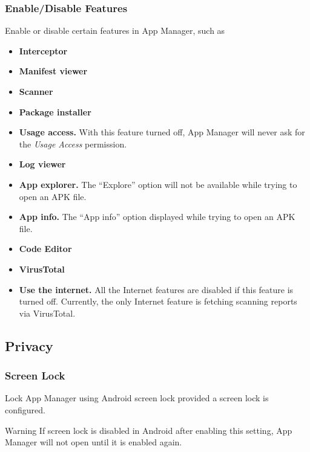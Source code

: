 \subsubsection{Enable/Disable Features}\label{subsubsec:enable/disable-features} %
Enable or disable certain features in App Manager, such as
\begin{itemize}
    \item \textbf{Interceptor}
    \item \textbf{Manifest viewer}
    \item \textbf{Scanner}
    \item \textbf{Package installer}
    \item \textbf{Usage access.} With this feature turned off, App Manager will never ask for the \textit{Usage Access} permission.
    \item \textbf{Log viewer}
    \item \textbf{App explorer.} The ``Explore'' option will not be available while trying to open an APK file.
    \item \textbf{App info.} The ``App info'' option displayed while trying to open an APK file.
    \item \textbf{Code Editor}
    \item \textbf{VirusTotal}
    \item \textbf{Use the internet.} All the Internet features are disabled if this feature is turned off.
    Currently, the only Internet feature is fetching scanning reports via VirusTotal.
\end{itemize}

\subsection{Privacy}\label{subsec:privacy} %

\subsubsection{Screen Lock}\label{subsubsec:screen-lock} %
Lock App Manager using Android screen lock provided a screen lock is configured.

\begin{warning}{Warning}
    If screen lock is disabled in Android after enabling this setting, App Manager will not open until it is enabled again.
\end{warning}

